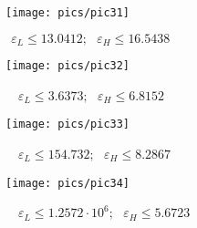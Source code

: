 \begin{figure}[H]
    \centering
    \caption{$~~\varepsilon_L\le13.0412;~~~\varepsilon_H\le16.5438$}
    \texttt{[image: pics/pic31]}
    \label{pic:31}
\end{figure}
\begin{figure}[H]
    \centering
    \caption{~~$\varepsilon_L\le3.6373;~~~\varepsilon_H\le6.8152$}
    \texttt{[image: pics/pic32]}
    \label{pic:32}
\end{figure}
\begin{figure}[H]
    \centering
    \caption{~~$\varepsilon_L\le154.732;~~~\varepsilon_H\le8.2867$}
    \texttt{[image: pics/pic33]}
    \label{pic:33}
\end{figure}
\begin{figure}[H]
    \centering
    \caption{~~$\varepsilon_L\le1.2572\cdot10^{6};~~~\varepsilon_H\le5.6723$}
    \texttt{[image: pics/pic34]}
    \label{pic:34}
\end{figure}